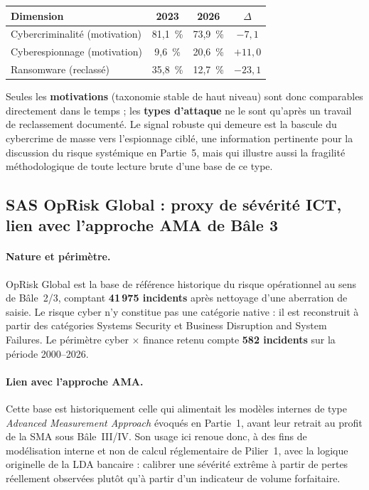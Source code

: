 \documentclass[11pt,a4paper]{article}
\theoremstyle{navystyle}
\theoremstyle{navydef}
\begin{document}
\begin{center}
\renewcommand{\arraystretch}{1.3}
\begin{tabular}{>{\raggedright}p{4.5cm} c c c}
\toprule
\rowcolor{lightblue}
\textbf{Dimension} & \textbf{2023} & \textbf{2026} & \textbf{$\Delta$} \\
\midrule
Cybercriminalité (motivation) & 81{,}1~\% & 73{,}9~\% & $-7{,}1$ \\
Cyberespionnage (motivation) & 9{,}6~\% & 20{,}6~\% & $+11{,}0$ \\
Ransomware (reclassé) & 35{,}8~\% & 12{,}7~\% & $-23{,}1$ \\
\bottomrule
\end{tabular}
\end{center}

Seules les \textbf{motivations} (taxonomie stable de haut niveau) sont donc
comparables directement dans le temps ; les \textbf{types d'attaque} ne le
sont qu'après un travail de reclassement documenté. Le signal robuste qui
demeure est la bascule du cybercrime de masse vers l'espionnage ciblé, une
information pertinente pour la discussion du risque systémique en Partie~5,
mais qui illustre aussi la fragilité méthodologique de toute lecture brute
d'une base de ce type.

\subsection{SAS OpRisk Global : proxy de sévérité ICT, lien avec l'approche AMA de Bâle 3}

\paragraph{Nature et périmètre.} OpRisk Global est la base de référence
historique du risque opérationnel au sens de Bâle~2/3, comptant
\textbf{41\,975 incidents} après nettoyage d'une aberration de saisie. Le
risque cyber n'y constitue pas une catégorie native : il est reconstruit à
partir des catégories \og Systems Security\fg{} et \og Business Disruption and
System Failures\fg{}. Le périmètre cyber $\times$ finance retenu compte
\textbf{582 incidents} sur la période 2000--2026.

\paragraph{Lien avec l'approche AMA.} Cette base est historiquement celle
qui alimentait les modèles internes de type \emph{Advanced Measurement
Approach} évoqués en Partie~1, avant leur retrait au profit de la SMA sous
Bâle~III/IV. Son usage ici renoue donc, à des fins de modélisation interne et
non de calcul réglementaire de Pilier~1, avec la logique originelle de la LDA
bancaire : calibrer une sévérité extrême à partir de pertes réellement
observées plutôt qu'à partir d'un indicateur de volume forfaitaire.
\end{document}
